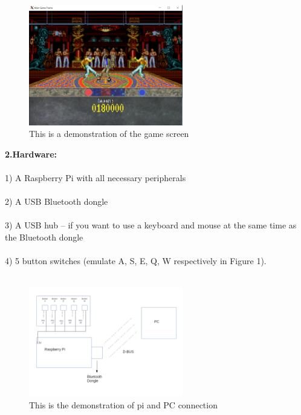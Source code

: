 \documentclass[a4paper]{article}
\begin{document}
\begin{figure} [h]
\centering
\includegraphics[width=0.6\textwidth]{game_graphics.png}
\caption{\label{fig:pi}This is a demonstration of the game screen}
\end{figure}

\textbf{2.Hardware:}\\\\
1) A Raspberry Pi with all necessary peripherals   \\\\
2) A USB Bluetooth dongle \\\\
3) A USB hub – if you want to use a keyboard and mouse at the same time as the Bluetooth dongle  \\\\
4) 5 button switches  (emulate A, S, E, Q, W respectively in Figure 1).  \\\\

\begin{figure} [h]
\centering
\includegraphics[width=0.6\textwidth]{pidemo.png}
\caption{\label{fig:pi}This is the demonstration of pi and PC connection}
\end{figure}
\end{document}

